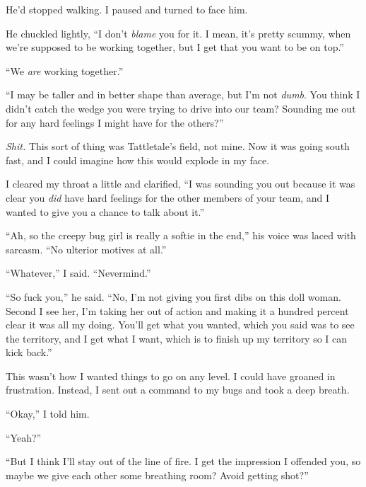 He'd stopped walking.  I paused and turned to face him.



He chuckled lightly, ``I don't \emph{blame} you for it.  I mean, it's pretty scummy, when we're supposed to be working together, but I get that you want to be on top.''



``We \emph{are }working together.''



``I may be taller and in better shape than average, but I'm not \emph{dumb}.  You think I didn't catch the wedge you were trying to drive into our team?  Sounding me out for any hard feelings I might have for the others?''



\emph{Shit.  }This sort of thing was Tattletale's field, not mine.  Now it was going south fast, and I could imagine how this would explode in my face.



I cleared my throat a little and clarified, ``I was sounding you out because it was clear you \emph{did} have hard feelings for the other members of your team, and I wanted to give you a chance to talk about it.''



``Ah, so the creepy bug girl is really a softie in the end,'' his voice was laced with sarcasm.  ``No ulterior motives at all.''



``Whatever,'' I said.  ``Nevermind.''



``So fuck you,'' he said.  ``No, I'm not giving you first dibs on this doll woman.  Second I see her, I'm taking her out of action and making it a hundred percent clear it was all my doing.  You'll get what you wanted, which you said was to see the territory, and I get what I want, which is to finish up my territory so I can kick back.''



This wasn't how I wanted things to go on any level.  I could have groaned in frustration.  Instead, I sent out a command to my bugs and took a deep breath.



``Okay,'' I told him.



``Yeah?''



``But I think I'll stay out of the line of fire.  I get the impression I offended you, so maybe we give each other some breathing room?  Avoid getting shot?''



